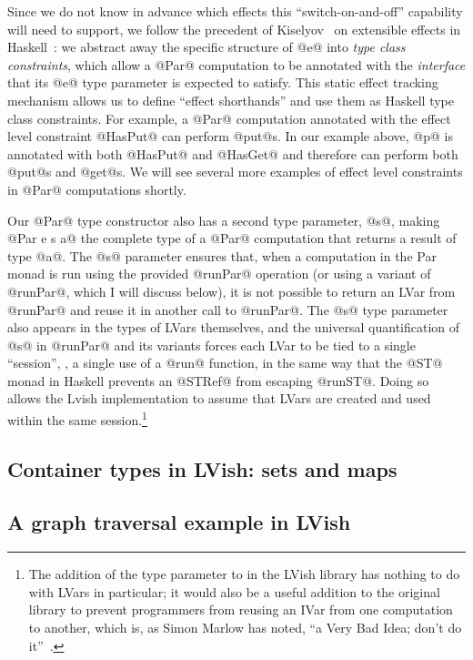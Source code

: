 Since we do not know in advance which effects this
``switch-on-and-off'' capability will need to support, we follow the
precedent of Kiselyov \etal~on extensible effects in
Haskell~\cite{oleg-amr-haskell-2013}: we abstract away the specific
structure of @e@ into \emph{type class constraints}, which allow a
@Par@ computation to be annotated with the \emph{interface} that its
@e@ type parameter is expected to satisfy.  This static effect
tracking mechanism allows us to define ``effect shorthands'' and use
them as Haskell type class constraints.  For example, a @Par@
computation annotated with the effect level constraint @HasPut@ can
perform @put@s.  In our example above, @p@ is annotated with both
@HasPut@ and @HasGet@ and therefore can perform both @put@s and
@get@s.  We will see several more examples of effect level constraints
in @Par@ computations shortly.

Our @Par@ type constructor also has a second type parameter, @s@,
making @Par e s a@ the complete type of a @Par@ computation that
returns a result of type @a@.  The @s@ parameter ensures that, when a
computation in the Par monad is run using the provided @runPar@
operation (or using a variant of @runPar@, which I will discuss
below), it is not possible to return an LVar from @runPar@ and reuse
it in another call to @runPar@.  The @s@ type parameter also appears
in the types of LVars themselves, and the universal quantification of
@s@ in @runPar@ and its variants forces each LVar to be tied to a
single ``session'', \ie, a single use of a @run@ function, in the same
way that the @ST@ monad in Haskell prevents an @STRef@ from escaping
@runST@.  Doing so allows the Lvish implementation to assume that
LVars are created and used within the same session.\footnote{The
  addition of the  type parameter to  in the LVish
  library has nothing to do with LVars in particular; it would also be
  a useful addition to the original  library to prevent
  programmers from reusing an IVar from one  computation to
  another, which is, as Simon Marlow has noted, ``a Very Bad Idea;
  don't do it''~\cite{marlow-book}.}

\subsection{Container types in LVish: sets and maps}


\subsection{A graph traversal example in LVish}

